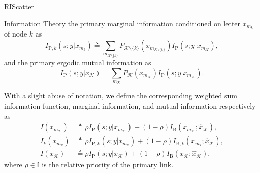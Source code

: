 \documentclass[journal]{IEEEtran}
\begin{document}
\begin{section}{RIScatter}
\begin{subsection}{Information Theory}
		the primary marginal information conditioned on letter $x_{m_k}$ of node $k$ as
		\begin{equation}
			I_{\mathrm{P},k}(s;y|x_{m_k}) \triangleq \sum_{m_{\mathcal{K} \setminus \{k\}}} P_{\mathcal{K} \setminus \{k\}}(x_{m_{\mathcal{K} \setminus \{k\}}}) I_{\mathrm{P}}(s;y|x_{m_{\mathcal{K}}}),
			\label{eq:primary_marginal_information}
		\end{equation}
		and the primary ergodic mutual information as
		\begin{equation}
			I_{\mathrm{P}}(s;y|x_{\mathcal{K}}) = \sum_{m_{\mathcal{K}}} P_{\mathcal{K}}(x_{m_{\mathcal{K}}}) I_{\mathrm{P}}(s;y|x_{m_{\mathcal{K}}}).
			\label{eq:primary_mutual_information}
		\end{equation}

		With a slight abuse of notation, we define the corresponding weighted sum information function, marginal information, and mutual information respectively as
		\begin{align}
			I(x_{m_{\mathcal{K}}})
			 & \triangleq \rho I_{\mathrm{P}}(s;y|x_{m_{\mathcal{K}}}) + (1 - \rho) I_{\mathrm{B}}(x_{m_{\mathcal{K}}};\hat{x}_{\mathcal{K}}),\label{eq:weighted_sum_information_function} \\
			I_k(x_{m_k})
			 & \triangleq \rho I_{\mathrm{P},k}(s;y|x_{m_k}) + (1 - \rho) I_{\mathrm{B},k}(x_{m_k};\hat{x}_{\mathcal{K}}),\label{eq:weighted_sum_marginal_information}                     \\
			I(x_{\mathcal{K}})
			 & \triangleq \rho I_{\mathrm{P}}(s;y|x_{\mathcal{K}}) + (1 - \rho) I_{\mathrm{B}}(x_{\mathcal{K}};\hat{x}_{\mathcal{K}}),\label{eq:weighted_sum_mutual_information}
		\end{align}
		where $\rho \in \mathbb{I}$ is the relative priority of the primary link.
		\label{se:information_theory}
	\end{subsection}
	\label{se:riscatter}
\end{section}
\end{document}
